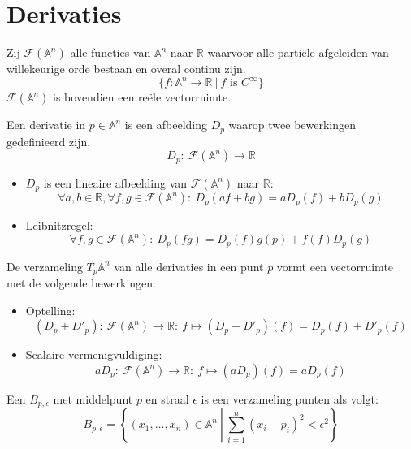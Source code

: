 \documentclass[main.tex]{subfiles}
\begin{document}
\chapter{Derivaties}
\label{cha:derivaties}

\begin{de}
  Zij $\mathcal{F}(\mathbb{A}^{n})$ alle functies van $\mathbb{A}^{n}$ naar $\mathbb{R}$ waarvoor alle parti\"ele afgeleiden van willekeurige orde bestaan en overal continu zijn.
  \[ \{ f: \mathbb{A}^{n} \rightarrow \mathbb{R} \ |\ f \text{ is } C^{\infty} \} \]
  $\mathcal{F}(\mathbb{A}^{n})$ is bovendien een re\"ele vectorruimte.
\end{de}

\begin{de}
  Een derivatie in $p\in\mathbb{A}^{n}$ is een afbeelding $D_{p}$ waarop twee bewerkingen gedefinieerd zijn.
  \[ D_{p}:\ \mathcal{F}(\mathbb{A}^{n}) \rightarrow \mathbb{R} \]
  \begin{itemize}
  \item $D_{p}$ is een lineaire afbeelding van $\mathcal{F}(\mathbb{A}^{n})$ naar $\mathbb{R}$:
    \[ \forall a,b \in \mathbb{R}, \forall f,g \in \mathcal{F}(\mathbb{A}^{n}):\ D_{p}(af + bg) = aD_{p}(f) + bD_{p}(g) \]
  \item Leibnitzregel: 
    \[ \forall f,g \in \mathcal{F}(\mathbb{A}^{n}):\ D_{p}(fg) = D_{p}(f)g(p) + f(f)D_{p}(g)\]
  \end{itemize}
\end{de}

\begin{ei}
  De verzameling $T_{p}\mathbb{A}^{n}$ van alle derivaties in een punt $p$ vormt een vectorruimte met de volgende bewerkingen:
  \begin{itemize}
  \item Optelling:
    \[ (D_{p} + D'_{p}):\ \mathcal{F}(\mathbb{A}^{n}) \rightarrow \mathbb{R}:\ f \mapsto (D_{p} + D'_{p})(f) = D_{p}(f) + D'_{p}(f)\]
  \item Scalaire vermenigvuldiging:
    \[ aD_{p}:\ \mathcal{F}(\mathbb{A}^{n}) \rightarrow \mathbb{R}:\ f \mapsto (aD_{p})(f) = aD_{p}(f)\]
  \end{itemize}
\end{ei}

\begin{de}
  Een  $B_{p,\epsilon}$ met middelpunt $p$ en straal $\epsilon$ is een verzameling punten als volgt:
  \[ B_{p,\epsilon} = \left\{ (x_{1},\dotsc ,x_{n})\in \mathbb{A}^{n}\ \left|\ \sum_{i=1}^{n}(x_{i}-p_{i})^{2} < \epsilon^{2} \right.\right\}\]
\end{de}
\end{document}
